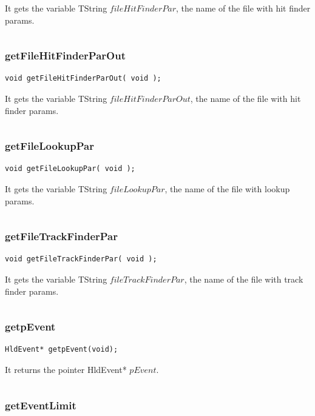 \documentclass[a4paper]{book}
\begin{document}
It gets the variable TString $fileHitFinderPar$, the name of the file with hit finder params.

\[\]

\subsubsection{getFileHitFinderParOut}

\begin{lstlisting}
void getFileHitFinderParOut( void );
\end{lstlisting}

It gets the variable TString $fileHitFinderParOut$, the name of the file with hit finder params.

\[\]

\subsubsection{getFileLookupPar}

\begin{lstlisting}
void getFileLookupPar( void );
\end{lstlisting}

It gets the variable TString $fileLookupPar$, the name of the file with lookup params.

\[\]

\subsubsection{getFileTrackFinderPar}

\begin{lstlisting}
void getFileTrackFinderPar( void );
\end{lstlisting}

It gets the variable TString $fileTrackFinderPar$, the name of the file with track finder params.

\[\]

\subsubsection{getpEvent}

\begin{lstlisting}
HldEvent* getpEvent(void);
\end{lstlisting}

It returns the pointer HldEvent* $pEvent$.

\[\]

\subsubsection{getEventLimit}
\end{document}
